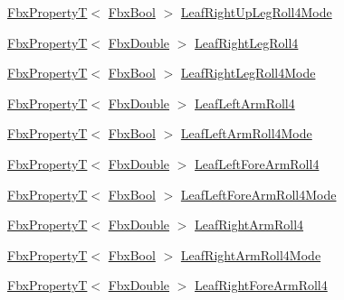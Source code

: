 \begin{DoxyCompactItemize}
\item 
\hyperlink{class_fbx_property_t}{Fbx\+PropertyT}$<$ \hyperlink{fbxtypes_8h_a92e0562b2fe33e76a242f498b362262e}{Fbx\+Bool} $>$ \hyperlink{class_fbx_character_a76523d2ef3801ccbed39bfa5fd4cb714}{Leaf\+Right\+Up\+Leg\+Roll4\+Mode}
\item 
\hyperlink{class_fbx_property_t}{Fbx\+PropertyT}$<$ \hyperlink{fbxtypes_8h_a171e72a1c46fc15c1a6c9c31948c1c5b}{Fbx\+Double} $>$ \hyperlink{class_fbx_character_a07cad7de4af769b89577dc772647fd4d}{Leaf\+Right\+Leg\+Roll4}
\item 
\hyperlink{class_fbx_property_t}{Fbx\+PropertyT}$<$ \hyperlink{fbxtypes_8h_a92e0562b2fe33e76a242f498b362262e}{Fbx\+Bool} $>$ \hyperlink{class_fbx_character_adaeb7f86cd9f71ee53b312b2a63b4442}{Leaf\+Right\+Leg\+Roll4\+Mode}
\item 
\hyperlink{class_fbx_property_t}{Fbx\+PropertyT}$<$ \hyperlink{fbxtypes_8h_a171e72a1c46fc15c1a6c9c31948c1c5b}{Fbx\+Double} $>$ \hyperlink{class_fbx_character_a71eeeaeb6d7590b797a721b0ea597770}{Leaf\+Left\+Arm\+Roll4}
\item 
\hyperlink{class_fbx_property_t}{Fbx\+PropertyT}$<$ \hyperlink{fbxtypes_8h_a92e0562b2fe33e76a242f498b362262e}{Fbx\+Bool} $>$ \hyperlink{class_fbx_character_ac3828ba481f4976a8b14b411bbf146d2}{Leaf\+Left\+Arm\+Roll4\+Mode}
\item 
\hyperlink{class_fbx_property_t}{Fbx\+PropertyT}$<$ \hyperlink{fbxtypes_8h_a171e72a1c46fc15c1a6c9c31948c1c5b}{Fbx\+Double} $>$ \hyperlink{class_fbx_character_a02279dced3b6a214c2d84bc5be923035}{Leaf\+Left\+Fore\+Arm\+Roll4}
\item 
\hyperlink{class_fbx_property_t}{Fbx\+PropertyT}$<$ \hyperlink{fbxtypes_8h_a92e0562b2fe33e76a242f498b362262e}{Fbx\+Bool} $>$ \hyperlink{class_fbx_character_a4bb0d0c05ec6d9ee54386042adb9bbc2}{Leaf\+Left\+Fore\+Arm\+Roll4\+Mode}
\item 
\hyperlink{class_fbx_property_t}{Fbx\+PropertyT}$<$ \hyperlink{fbxtypes_8h_a171e72a1c46fc15c1a6c9c31948c1c5b}{Fbx\+Double} $>$ \hyperlink{class_fbx_character_ac95f0fafee5ee51e4be50954de0d0876}{Leaf\+Right\+Arm\+Roll4}
\item 
\hyperlink{class_fbx_property_t}{Fbx\+PropertyT}$<$ \hyperlink{fbxtypes_8h_a92e0562b2fe33e76a242f498b362262e}{Fbx\+Bool} $>$ \hyperlink{class_fbx_character_afaeb5a33929f72707cce2bc030edc837}{Leaf\+Right\+Arm\+Roll4\+Mode}
\item 
\hyperlink{class_fbx_property_t}{Fbx\+PropertyT}$<$ \hyperlink{fbxtypes_8h_a171e72a1c46fc15c1a6c9c31948c1c5b}{Fbx\+Double} $>$ \hyperlink{class_fbx_character_a137288a59c2effdd4dc58be5d2dc27b8}{Leaf\+Right\+Fore\+Arm\+Roll4}

\end{DoxyCompactItemize}
